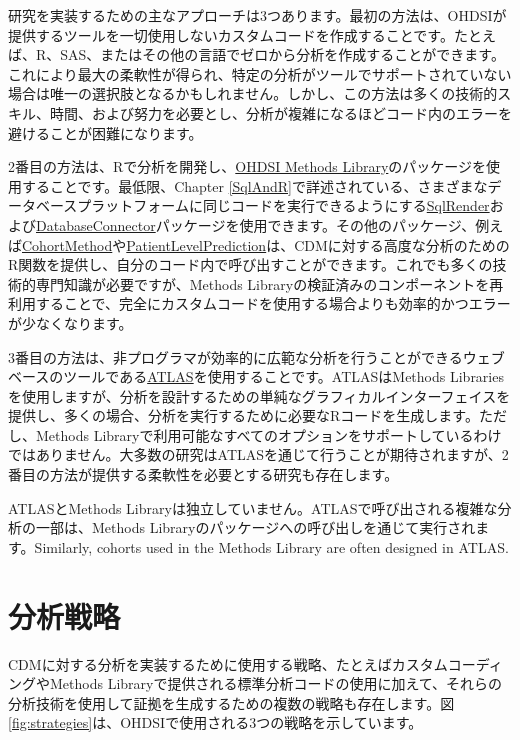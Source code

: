 \documentclass[
  11pt]{book}
\theoremstyle{definition}
\theoremstyle{definition}
\theoremstyle{definition}
\theoremstyle{definition}
\theoremstyle{remark}
\begin{document}
研究を実装するための主なアプローチは3つあります。最初の方法は、OHDSIが提供するツールを一切使用しないカスタムコードを作成することです。たとえば、R、SAS、またはその他の言語でゼロから分析を作成することができます。これにより最大の柔軟性が得られ、特定の分析がツールでサポートされていない場合は唯一の選択肢となるかもしれません。しかし、この方法は多くの技術的スキル、時間、および努力を必要とし、分析が複雑になるほどコード内のエラーを避けることが困難になります。

2番目の方法は、Rで分析を開発し、\href{https://ohdsi.github.io/MethodsLibrary/}{OHDSI Methods Library}のパッケージを使用することです。最低限、Chapter \ref{SqlAndR}で詳述されている、さまざまなデータベースプラットフォームに同じコードを実行できるようにする\href{https://ohdsi.github.io/SqlRender/}{SqlRender}および\href{https://ohdsi.github.io/DatabaseConnector/}{DatabaseConnector}パッケージを使用できます。その他のパッケージ、例えば\href{https://ohdsi.github.io/CohortMethod/}{CohortMethod}や\href{https://ohdsi.github.io/PatientLevelPrediction/}{PatientLevelPrediction}は、CDMに対する高度な分析のためのR関数を提供し、自分のコード内で呼び出すことができます。これでも多くの技術的専門知識が必要ですが、Methods Libraryの検証済みのコンポーネントを再利用することで、完全にカスタムコードを使用する場合よりも効率的かつエラーが少なくなります。

3番目の方法は、非プログラマが効率的に広範な分析を行うことができるウェブベースのツールである\href{https://github.com/OHDSI/Atlas/wiki}{ATLAS}を使用することです。ATLASはMethods Librariesを使用しますが、分析を設計するための単純なグラフィカルインターフェイスを提供し、多くの場合、分析を実行するために必要なRコードを生成します。ただし、Methods Libraryで利用可能なすべてのオプションをサポートしているわけではありません。大多数の研究はATLASを通じて行うことが期待されますが、2番目の方法が提供する柔軟性を必要とする研究も存在します。

ATLASとMethods Libraryは独立していません。ATLASで呼び出される複雑な分析の一部は、Methods Libraryのパッケージへの呼び出しを通じて実行されます。Similarly, cohorts used in the Methods Library are often designed in ATLAS.

\section{分析戦略}\label{ux5206ux6790ux6226ux7565}

CDMに対する分析を実装するために使用する戦略、たとえばカスタムコーディングやMethods Libraryで提供される標準分析コードの使用に加えて、それらの分析技術を使用して証拠を生成するための複数の戦略も存在します。図\ref{fig:strategies}は、OHDSIで使用される3つの戦略を示しています。
\end{document}
